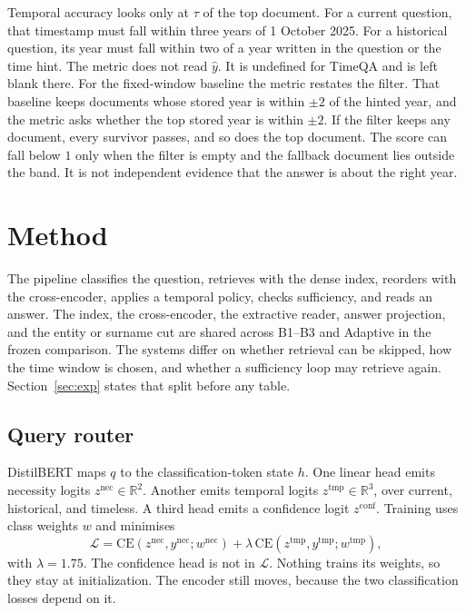 \documentclass[11pt]{article}
\begin{document}
Temporal accuracy looks only at $\tau$ of the top document.
For a current question, that timestamp must fall within three years of 1 October 2025.
For a historical question, its year must fall within two of a year written in the question or the time hint.
The metric does not read $\hat{y}$.
It is undefined for TimeQA and is left blank there.
For the fixed-window baseline the metric restates the filter.
That baseline keeps documents whose stored year is within $\pm 2$ of the hinted year, and the metric asks whether the top stored year is within $\pm 2$.
If the filter keeps any document, every survivor passes, and so does the top document.
The score can fall below $1$ only when the filter is empty and the fallback document lies outside the band.
It is not independent evidence that the answer is about the right year.

\section{Method}
\label{sec:method}

The pipeline classifies the question, retrieves with the dense index, reorders with the cross-encoder, applies a temporal policy, checks sufficiency, and reads an answer.
The index, the cross-encoder, the extractive reader, answer projection, and the entity or surname cut are shared across B1--B3 and Adaptive in the frozen comparison.
The systems differ on whether retrieval can be skipped, how the time window is chosen, and whether a sufficiency loop may retrieve again.
Section~\ref{sec:exp} states that split before any table.

\subsection{Query router}
\label{sec:router}

DistilBERT maps $q$ to the classification-token state $h$.
One linear head emits necessity logits $z^{\mathrm{nec}}\in\mathbb{R}^{2}$.
Another emits temporal logits $z^{\mathrm{tmp}}\in\mathbb{R}^{3}$, over current, historical, and timeless.
A third head emits a confidence logit $z^{\mathrm{conf}}$.
Training uses class weights $w$ and minimises
\begin{equation}
\mathcal{L}
= \mathrm{CE}\!\left(z^{\mathrm{nec}}, y^{\mathrm{nec}}; w^{\mathrm{nec}}\right)
+ \lambda\,
\mathrm{CE}\!\left(z^{\mathrm{tmp}}, y^{\mathrm{tmp}}; w^{\mathrm{tmp}}\right),
\label{eq:loss}
\end{equation}
with $\lambda = 1.75$.
The confidence head is not in $\mathcal{L}$.
Nothing trains its weights, so they stay at initialization.
The encoder still moves, because the two classification losses depend on it.
\end{document}
